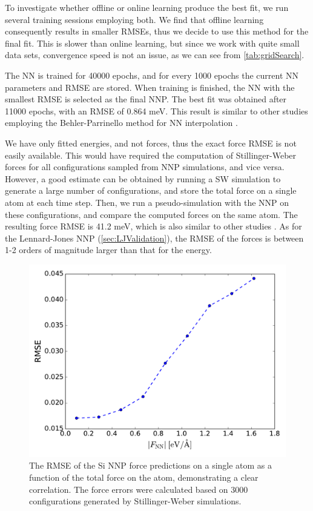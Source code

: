 \documentclass[twoside,english]{uiofysmaster}
\begin{document}
To investigate whether offline or online learning produce the best fit, we run several training sessions employing both. 
We find that offline learning consequently results in smaller RMSEs, thus we decide to use this method for the final fit. 
This is slower than online learning, but since we work with quite small data sets, convergence speed is not an issue, 
as we can see from \autoref{tab:gridSearch}. 

The NN is trained for 40000 epochs, and for every 1000 epochs the current NN parameters 
and RMSE are stored. When training is finished, the NN with the smallest RMSE is selected as the final NNP. 
The best fit was obtained after 11000 epochs, with an RMSE of 0.864 meV. This result is similar to other studies
employing the Behler-Parrinello method for NN interpolation \cite{Behler07} \cite{Artrith12} \cite{Natarajan16} .  

We have only fitted energies, and not forces, thus the exact force RMSE is not easily available. This would have required 
the computation of Stillinger-Weber forces for all configurations sampled from NNP simulations, and vice versa.
However, a good estimate can be obtained by running a SW simulation to generate a large number of configurations, and 
store the total force on a single atom at each time step. Then, we run a pseudo-simulation with the NNP on these configurations, 
and compare the computed forces on the same atom. The resulting force RMSE is 41.2 meV, 
which is also similar to other studies \cite{Artrith12} \cite{Natarajan16}. 
As for the Lennard-Jones NNP (\autoref{sec:LJValidation}), the RMSE of the forces is between 1-2 orders of magnitude 
larger than that for the energy.
\begin{figure}
\centering
  \includegraphics[width = 0.7\linewidth]{Figures/Results/SiForces.pdf}
  \caption{The RMSE of the Si NNP force predictions on a single atom as a function of the total force on the atom,
	   demonstrating a clear correlation. 
	   The force errors were calculated based on 3000 configurations generated by Stillinger-Weber simulations.}
  \label{fig:SiForces}
\end{figure}
\end{document}
